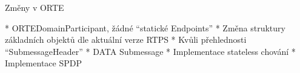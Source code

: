 \sec Změny v ORTE

* ORTEDomainParticipant, žádné ``statické Endpoints''
* Změna struktury základních objektů dle aktuální verze RTPS
* Kvůli přehlednosti ``SubmessageHeader''
* DATA Submessage
* Implementace stateless chování
* Implementace SPDP

